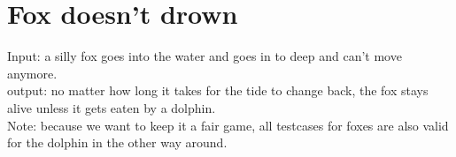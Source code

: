 \documentclass[a4paper,11pt]{article}
\begin{document}
    \section{Fox doesn't drown}
    Input: a silly fox goes into the water and goes in to deep and can't move anymore.\\
    output: no matter how long it takes for the tide to change back, the fox stays alive unless it gets eaten by a dolphin.\\


    Note: because we want to keep it a fair game, all testcases for foxes are also valid for the dolphin in the other way around.\\
\end{document}
